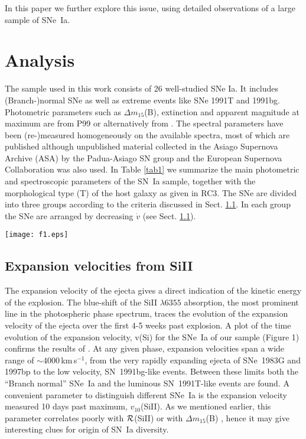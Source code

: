\documentclass[preprint2]{aastex}
\newcommand{\dm}{$\Delta m_{15}$(B)}
\newcommand{\RSi}{$\cal R$(SiII)}
\newcommand{\vSiiX}{$v_{10}$(SiII)}
\newcommand{\kms}{km\,s$^{-1}$}
\begin{document}
In this paper we further explore this issue, using detailed
observations of a large sample of SNe~Ia.


\section{Analysis}\label{}

The sample used in this work consists of 26 well-studied SNe Ia. It
includes (Branch-)normal SNe \citep{bra93a} as well as extreme events
like SNe 1991T and 1991bg. Photometric parameters such as \dm,
extinction and apparent magnitude at maximum are from P99 or
alternatively from \citet{alt04}. The spectral parameters have been
(re-)measured homogeneously on the available spectra, most of which
are published although unpublished material collected in the Asiago
Supernova Archive (ASA) by the Padua-Asiago SN group and the European
Supernova Collaboration was also used. In Table \ref{tab1} we
summarize the main photometric and spectroscopic parameters of the
SN~Ia sample, together with the morphological type (T) of the host
galaxy as given in RC3. The SNe are divided into three groups
according to the criteria discussed in Sect. \ref{exp}. In each group 
the SNe are arranged by decreasing $\dot{v}$ (see Sect. \ref{exp}).

\begin{figure*}
\texttt{[image: f1.eps]}
\caption{Time evolution of the photospheric velocity derived from 
SiII $\lambda 6355$ for the SNe of Tab.\ \ref{tab1}. The filled symbols refer to HVG,
open symbols to LVG and starred to FAINT SN~Ia. }
\end{figure*}

\subsection{Expansion velocities from SiII} \label{exp}

The expansion velocity of the ejecta gives a direct indication of the
kinetic energy of the explosion. The blue-shift of the SiII $\lambda
6355$ absorption, the most prominent line in the photospheric phase
spectrum, traces the evolution of the expansion velocity of the ejecta
over the first 4-5 weeks past explosion. A plot of the time evolution
of the expansion velocity, v(Si) for the SNe~Ia of our sample (Figure
1) confirms the results of \citet{bra87}. At any given phase,
expansion velocities span a wide range of $\sim 4000$\,\kms, from the
very rapidly expanding ejecta of SNe~1983G and 1997bp to the low
velocity, SN~1991bg-like events. Between these limits both the
``Branch normal'' SNe~Ia and the luminous SN~1991T-like events are
found. A convenient parameter to distinguish different SNe~Ia is the
expansion velocity measured 10 days past maximum, \vSiiX.  As we
mentioned earlier, this parameter correlates poorly with \RSi\/
\citep{hat00} or with \dm\/ \citep{pat96}, hence it may give
interesting clues for origin of SN~Ia diversity.
\end{document}
